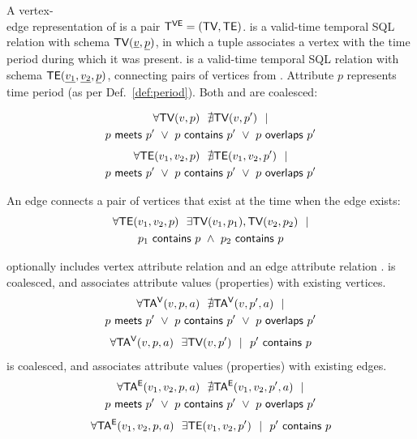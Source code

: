 \begin{definition}
A vertex-\\edge representation of \tg is a pair $\mathsf{T^{VE}}=(\textsf{TV}, \textsf{TE})$. \tv is
a valid-time temporal SQL relation with schema $\textsf{TV}(\underline{v},
\underline{p})$, in which a tuple associates a vertex with the time
period during which it was present. \te is a valid-time temporal SQL
relation with schema $\textsf{TE}(\underline{v_1}, \underline{v_2},
\underline{p})$, connecting pairs of vertices from \tv.  Attribute $p$
represents time period (as per Def.~\ref{def:period}).  Both \tv and
\te are coalesced:

\begin{multline}
\forall \textsf{TV}(v, p)~~\nexists \textsf{TV}(v, p')~~| \\
                       p~\mathsf{meets}~p'~\lor~p~\mathsf{contains}~p'~\lor~p~\mathsf{overlaps}~p'
\label{def:tg:c2}
\end{multline}
\vspace{-0.5cm}
\begin{multline}
\forall \textsf{TE}(v_1, v_2, p)~~\nexists \textsf{TE}(v_1,v_2, p')~~| \\
                       p~\mathsf{meets}~p'~\lor~p~\mathsf{contains}~p'~\lor~p~\mathsf{overlaps}~p'
\label{def:tg:c3}
\end{multline}

An edge connects a pair of vertices that exist at the time when the edge exists:
\begin{multline}
\forall \textsf{TE}(v_1, v_2, p)~~\exists \textsf{TV}(v_1, p_1), \textsf{TV}(v_2, p_2)~~| \\
                       p_1~\mathsf{contains}~p~\wedge~p_2~\mathsf{contains}~p
\label{def:tg:c1}
\end{multline}
\vspace{-0.5cm}

 optionally includes vertex attribute relation \tav and an
edge attribute relation \tae.  \tav is coalesced, and associates
attribute values (properties) with existing vertices.
\begin{multline}
\forall \mathsf{TA^{V}}(v, p, a)~~\nexists \mathsf{TA^{V}}(v, p', a)~~| \\
                       p~\mathsf{meets}~p'~\lor~p~\mathsf{contains}~p'~\lor~p~\mathsf{overlaps}~p'
\label{def:tg:c4}
\end{multline}
\begin{multline}
\forall \mathsf{TA^{V}}(v, p, a)~~\exists \textsf{TV}(v,p')~~|~~p'~\mathsf{contains}~p
\label{def:tg:c5}
\end{multline}
\tae is coalesced, and associates attribute values (properties) with
existing edges.
\begin{multline}
\forall \mathsf{TA^{E}}(v_1, v_2, p, a)~~\nexists \mathsf{TA^{E}}(v_1, v_2, p', a)~~| \\
                       p~\mathsf{meets}~p'~\lor~p~\mathsf{contains}~p'~\lor~p~\mathsf{overlaps}~p'
\label{def:tg:c6}
\end{multline}
\begin{multline}
\forall \mathsf{TA^{E}}(v_1, v_2, p, a)~~\exists \textsf{TE}(v_1,v_2,p')~~|~~p'~\mathsf{contains}~p
\label{def:tg:c7}
\end{multline}

\label{def:tg}
\end{definition}

